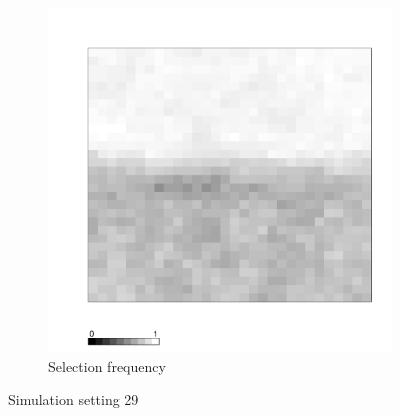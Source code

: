 \documentclass[authoryear, review, 11pt]{elsarticle}
\begin{document}
\begin{figure}
	\begin{subfigure}[b]{0.45\textwidth}
	\centering
		\includegraphics[width=\textwidth]{../../figures/simulation/X1.15.29.selection.pdf}
		\caption{Selection frequency}
	\end{subfigure}
	\caption{Simulation setting 29}
\end{figure}
\end{document}
